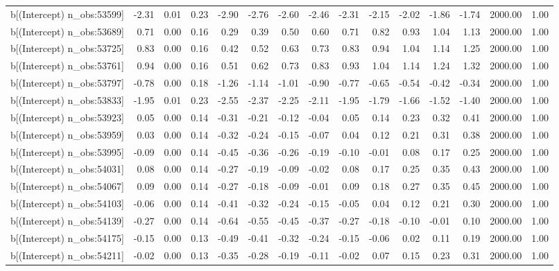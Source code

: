 \begin{table}[ht]
\begin{tabular}{rrrrrrrrrrrrrrr}
  b[(Intercept) n\_obs:53599] & -2.31 & 0.01 & 0.23 & -2.90 & -2.76 & -2.60 & -2.46 & -2.31 & -2.15 & -2.02 & -1.86 & -1.74 & 2000.00 & 1.00 \\ 
  b[(Intercept) n\_obs:53689] & 0.71 & 0.00 & 0.16 & 0.29 & 0.39 & 0.50 & 0.60 & 0.71 & 0.82 & 0.93 & 1.04 & 1.13 & 2000.00 & 1.00 \\ 
  b[(Intercept) n\_obs:53725] & 0.83 & 0.00 & 0.16 & 0.42 & 0.52 & 0.63 & 0.73 & 0.83 & 0.94 & 1.04 & 1.14 & 1.25 & 2000.00 & 1.00 \\ 
  b[(Intercept) n\_obs:53761] & 0.94 & 0.00 & 0.16 & 0.51 & 0.62 & 0.73 & 0.83 & 0.93 & 1.04 & 1.14 & 1.24 & 1.32 & 2000.00 & 1.00 \\ 
  b[(Intercept) n\_obs:53797] & -0.78 & 0.00 & 0.18 & -1.26 & -1.14 & -1.01 & -0.90 & -0.77 & -0.65 & -0.54 & -0.42 & -0.34 & 2000.00 & 1.00 \\ 
  b[(Intercept) n\_obs:53833] & -1.95 & 0.01 & 0.23 & -2.55 & -2.37 & -2.25 & -2.11 & -1.95 & -1.79 & -1.66 & -1.52 & -1.40 & 2000.00 & 1.00 \\ 
  b[(Intercept) n\_obs:53923] & 0.05 & 0.00 & 0.14 & -0.31 & -0.21 & -0.12 & -0.04 & 0.05 & 0.14 & 0.23 & 0.32 & 0.41 & 2000.00 & 1.00 \\ 
  b[(Intercept) n\_obs:53959] & 0.03 & 0.00 & 0.14 & -0.32 & -0.24 & -0.15 & -0.07 & 0.04 & 0.12 & 0.21 & 0.31 & 0.38 & 2000.00 & 1.00 \\ 
  b[(Intercept) n\_obs:53995] & -0.09 & 0.00 & 0.14 & -0.45 & -0.36 & -0.26 & -0.19 & -0.10 & -0.01 & 0.08 & 0.17 & 0.25 & 2000.00 & 1.00 \\ 
  b[(Intercept) n\_obs:54031] & 0.08 & 0.00 & 0.14 & -0.27 & -0.19 & -0.09 & -0.02 & 0.08 & 0.17 & 0.25 & 0.35 & 0.43 & 2000.00 & 1.00 \\ 
  b[(Intercept) n\_obs:54067] & 0.09 & 0.00 & 0.14 & -0.27 & -0.18 & -0.09 & -0.01 & 0.09 & 0.18 & 0.27 & 0.35 & 0.45 & 2000.00 & 1.00 \\ 
  b[(Intercept) n\_obs:54103] & -0.06 & 0.00 & 0.14 & -0.41 & -0.32 & -0.24 & -0.15 & -0.05 & 0.04 & 0.12 & 0.21 & 0.30 & 2000.00 & 1.00 \\ 
  b[(Intercept) n\_obs:54139] & -0.27 & 0.00 & 0.14 & -0.64 & -0.55 & -0.45 & -0.37 & -0.27 & -0.18 & -0.10 & -0.01 & 0.10 & 2000.00 & 1.00 \\ 
  b[(Intercept) n\_obs:54175] & -0.15 & 0.00 & 0.13 & -0.49 & -0.41 & -0.32 & -0.24 & -0.15 & -0.06 & 0.02 & 0.11 & 0.19 & 2000.00 & 1.00 \\ 
  b[(Intercept) n\_obs:54211] & -0.02 & 0.00 & 0.13 & -0.35 & -0.28 & -0.19 & -0.11 & -0.02 & 0.07 & 0.15 & 0.23 & 0.31 & 2000.00 & 1.00 \\ 

\end{tabular}
\end{table}
